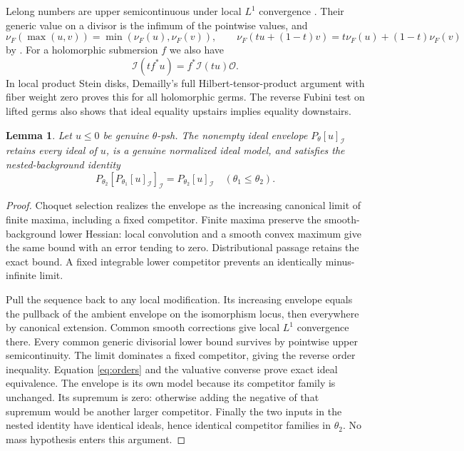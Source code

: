 \documentclass[11pt]{article}
\newcommand{\PI}[2]{P_{#1}[#2]_{\mathcal I}}
\newtheorem{lemma}[theorem]{Lemma}
\begin{document}
Lelong numbers are upper semicontinuous under local $L^1$ convergence
\cite[Lemma 2.6]{Bou}. Their generic value on a divisor is the infimum
of the pointwise values, and
\[
 \nu_F(\max(u,v))=\min(\nu_F(u),\nu_F(v)),\qquad
 \nu_F(tu+(1-t)v)=t\nu_F(u)+(1-t)\nu_F(v)
\]
by \cite[Corollary 2.10 and Section 10.2]{Bou}.
For a holomorphic submersion $f$ we also have
\begin{equation}\label{eq:submersion}
 \mathcal I(tf^*u)=f^*\mathcal I(tu)\mathcal O.
\end{equation}
In local product Stein disks, Demailly's full Hilbert-tensor-product
argument \cite[Propositions 5.7 and 14.2(i)]{Dem} with fiber weight zero
proves this for all holomorphic germs. The reverse Fubini test on lifted
germs also shows that ideal equality upstairs implies equality downstairs.

\begin{lemma}\label{lem:closure}
Let $u\leq0$ be genuine $\theta$-psh. The nonempty ideal envelope
$\PI{\theta}{u}$ retains every ideal of $u$, is a genuine normalized
ideal model, and satisfies the nested-background identity
\[
 \PI{\theta_2}{\PI{\theta_1}{u}}
          =\PI{\theta_2}{u}\quad(\theta_1\leq\theta_2).
\]
\end{lemma}
\begin{proof}
Choquet selection realizes the envelope as the increasing canonical limit
of finite maxima, including a fixed competitor. Finite maxima preserve
the smooth-background lower Hessian: local convolution and a smooth convex
maximum give the same bound with an error tending to zero. Distributional
passage retains the exact bound. A fixed integrable lower competitor
prevents an identically minus-infinite limit.

Pull the sequence back to any local modification. Its increasing envelope
equals the pullback of the ambient envelope on the isomorphism locus,
then everywhere by canonical extension. Common smooth corrections give
local $L^1$ convergence there. Every common generic divisorial lower bound
survives by pointwise upper semicontinuity. The limit dominates a fixed
competitor, giving the reverse order inequality. Equation
\eqref{eq:orders} and the valuative converse prove exact ideal equivalence.
The envelope is its own model because its competitor family is unchanged.
Its supremum is zero: otherwise adding the negative of that supremum
would be another larger competitor. Finally the two inputs in the nested
identity have identical ideals, hence identical competitor families in
$\theta_2$. No mass hypothesis enters this argument.
\end{proof}
\end{document}
